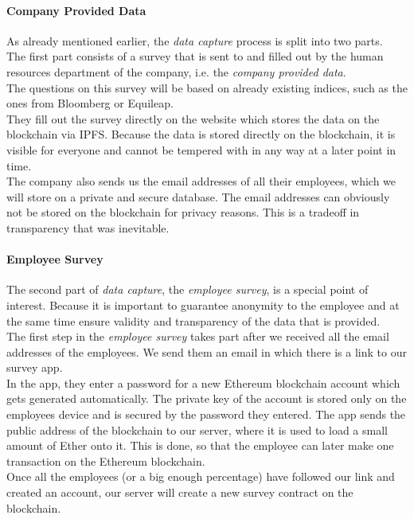 \paragraph*{Company Provided Data}
As already mentioned earlier, the \textit{data capture} process is split into two parts.\\
The first part consists of a survey that is sent to and filled out by the human resources department of the company, i.e. the \textit{company provided data}.\\
The questions on this survey will be based on already existing indices, such as the ones from Bloomberg or Equileap.\\
They fill out the survey directly on the website which stores the data on the blockchain via IPFS. Because the data is stored directly on the blockchain, it is visible for everyone and cannot be tempered with in any way at a later point in time.\\
The company also sends us the email addresses of all their employees, which we will store on a private and secure database. The email addresses can obviously not be stored on the blockchain for privacy reasons. This is a tradeoff in transparency that was inevitable.\\

\paragraph*{Employee Survey}
The second part of \textit{data capture}, the \textit{employee survey}, is a special point of interest. Because it is important to guarantee anonymity to the employee and at the same time ensure validity and transparency of the data that is provided.\\

The first step in the \textit{employee survey} takes part after we received all the email addresses of the employees. We send them an email in which there is a link to our survey app.\\
In the app, they enter a password for a new Ethereum blockchain account which gets generated automatically. The private key of the account is stored only on the employees device and is secured by the password they entered. The app sends the public address of the blockchain to our server, where it is used to load a small amount of Ether onto it. This is done, so that the employee can later make one transaction on the Ethereum blockchain.\\
Once all the employees (or a big enough percentage) have followed our link and created an account, our server will create a new survey contract on the blockchain.\\

